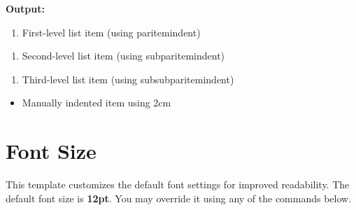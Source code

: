 \documentclass{VISTEC}
\begin{document}
\textbf{Output:}\vspace{0.5em}

\begin{tcolorbox}[colback=white, colframe=black, sharp corners, boxrule=0.4pt]
\begin{enumerate}[itemindent=\paritemindent]
  \item First-level list item (using paritemindent)
\end{enumerate}

\begin{enumerate}[itemindent=\subparitemindent]
  \item Second-level list item (using subparitemindent)
\end{enumerate}

\begin{enumerate}[itemindent=\subsubparitemindent]
  \item Third-level list item (using subsubparitemindent)
\end{enumerate}

\begin{itemize}[itemindent=2cm]
  \item Manually indented item using 2cm
\end{itemize}

\end{tcolorbox}





\section{Font Size}
\label{manual:font-size}

\begin{paragraph}
This template customizes the default font settings for improved readability. The default font size is \textbf{12pt}. You may override it using any of the commands below.
\end{paragraph}
\end{document}
